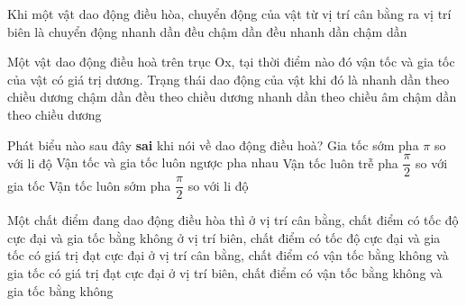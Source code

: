 \begin{ex}%
Khi một vật dao động điều hòa, chuyển động của vật từ vị trí cân bằng ra vị trí biên là chuyển động
\choice
{nhanh dần đều}
{chậm dần đều}
{nhanh dần}
{\True chậm dần}
\end{ex} 
\begin{ex}%
Một vật dao động điều hoà trên trục Ox, tại thời điểm nào đó vận tốc và gia tốc của vật có giá trị dương. Trạng thái dao động của vật khi đó là
\choice
{\True nhanh dần theo chiều dương}
{chậm dần đều theo chiều dương}
{nhanh dần theo chiều âm}
{chậm dần theo chiều dương}
\end{ex} 
\begin{ex}
Phát biểu nào sau đây \textbf{sai} khi nói về dao động điều hoà?
\choice
{Gia tốc sớm pha $\pi$ so với li độ}
{\True Vận tốc và gia tốc luôn ngược pha nhau}
{Vận tốc luôn trễ pha $\dfrac{\pi}{2}$ so với gia tốc}
{Vận tốc luôn sớm pha $\dfrac{\pi}{2}$ so với li độ}
\end{ex} 
\begin{ex}%
Một chất điểm đang dao động điều hòa thì
\choice
{\True ở vị trí cân bằng, chất điểm có tốc độ cực đại và gia tốc bằng không}
{ở vị trí biên, chất điểm có tốc độ cực đại và gia tốc có giá trị đạt cực đại}
{ở vị trí cân bằng, chất điểm có vận tốc bằng không và gia tốc có giá trị đạt cực đại}
{ở vị trí biên, chất điểm có vận tốc bằng không và gia tốc bằng không}
\end{ex} 
 
